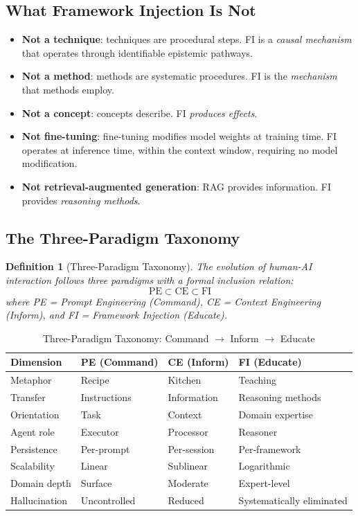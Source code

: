 \documentclass[12pt,a4paper]{article}
\newtheorem{definition}{Definition}[section]
\begin{document}
\subsection{What Framework Injection Is Not}

\begin{itemize}
  \item \textbf{Not a technique}: techniques are procedural steps. FI is a \emph{causal mechanism} that operates through identifiable epistemic pathways.
  \item \textbf{Not a method}: methods are systematic procedures. FI is the \emph{mechanism} that methods employ.
  \item \textbf{Not a concept}: concepts describe. FI \emph{produces effects}.
  \item \textbf{Not fine-tuning}: fine-tuning modifies model weights at training time. FI operates at inference time, within the context window, requiring no model modification.
  \item \textbf{Not retrieval-augmented generation}: RAG provides information. FI provides \emph{reasoning methods}.
\end{itemize}

\subsection{The Three-Paradigm Taxonomy}

\begin{definition}[Three-Paradigm Taxonomy]
The evolution of human-AI interaction follows three paradigms with a formal inclusion relation:
\[
\text{PE} \subset \text{CE} \subset \text{FI}
\]
where PE = Prompt Engineering (Command), CE = Context Engineering (Inform), and FI = Framework Injection (Educate).
\end{definition}

\begin{table}[H]
\centering
\caption{Three-Paradigm Taxonomy: Command $\to$ Inform $\to$ Educate}
\label{tab:taxonomy}
\begin{tabular}{@{}lp{3cm}p{3cm}p{3.5cm}@{}}
\toprule
\textbf{Dimension} & \textbf{PE (Command)} & \textbf{CE (Inform)} & \textbf{FI (Educate)} \\
\midrule
Metaphor & Recipe & Kitchen & Teaching \\
Transfer & Instructions & Information & Reasoning methods \\
Orientation & Task & Context & Domain expertise \\
Agent role & Executor & Processor & Reasoner \\
Persistence & Per-prompt & Per-session & Per-framework \\
Scalability & Linear & Sublinear & Logarithmic \\
Domain depth & Surface & Moderate & Expert-level \\
Hallucination & Uncontrolled & Reduced & Systematically eliminated \\
\bottomrule
\end{tabular}
\end{table}
\end{document}
